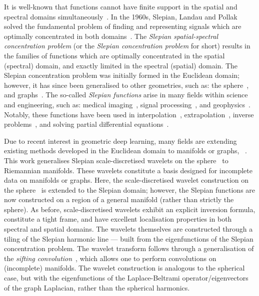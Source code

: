 It is well-known that functions cannot have finite support in the spatial and spectral domains simultaneously~\cite{Slepian1961,Slepian1983}.
In the 1960s, Slepian, Landau and Pollak solved the fundamental problem of finding and representing signals which are optimally concentrated in both domains~\cite{Slepian1961,Landau1961,Landau1962}.
The \emph{Slepian spatial-spectral concentration problem} (or the \emph{Slepian concentration problem} for short) results in the families of functions which are optimally concentrated in the spatial (spectral) domain, and exactly limited in the spectral (spatial) domain.
The Slepian concentration problem was initially formed in the Euclidean domain; however, it has since been generalised to other geometries, such as: the sphere~\cite{Simons2006,Wieczorek2005,Albertella1999,Cohen1989,Meaney1984,Daubechies1988}, and graphs~\cite{VanDeVille2017,VanDeVille2017a,Bolton2018}.
The so-called \emph{Slepian functions} arise in many fields within science and engineering, such as: medical imaging~\cite{Jackson1991}, signal processing~\cite{Mathews1985,Thomson1982}, and geophysics~\cite{Thomson1976,Simons2006a,Simons2011}.
Notably, these functions have been used in interpolation~\cite{Moore2004,Shkolnisky2006}, extrapolation~\cite{Xu1983}, inverse problems~\cite{Villiers2001,Abdelmoula2015}, and solving partial differential equations~\cite{Boyd2003,Chen2005}.

Due to recent interest in geometric deep learning, many fields are extending existing methods developed in the Euclidean domain to manifolds or graphs, \ie{}~\cite{Perlmutter2020}.
This work generalises Slepian scale-discretised wavelets on the sphere~\cite{Roddy2021a} to Riemannian manifolds.
These wavelets constitute a basis designed for incomplete data on manifolds or graphs.
Here, the scale-discretised wavelet construction on the sphere~\cite{Wiaux2008,McEwen2018,Leistedt2013,McEwen2013,McEwen2015} is extended to the Slepian domain; however, the Slepian functions are now constructed on a region of a general manifold (rather than strictly the sphere).
As before, scale-discretised wavelets exhibit an explicit inversion formula, constitute a tight frame, and have excellent localisation properties in both spectral and spatial domains.
The wavelets themselves are constructed through a tiling of the Slepian harmonic line --- built from the eigenfunctions of the Slepian concentration problem.
The wavelet transform follows through a generalisation of the \emph{sifting convolution}~\cite{Roddy2021}, which allows one to perform convolutions on (incomplete) manifolds.
The wavelet construction is analogous to the spherical case, but with the eigenfunctions of the Laplace-Beltrami operator/eigenvectors of the graph Laplacian, rather than the spherical harmonics.

